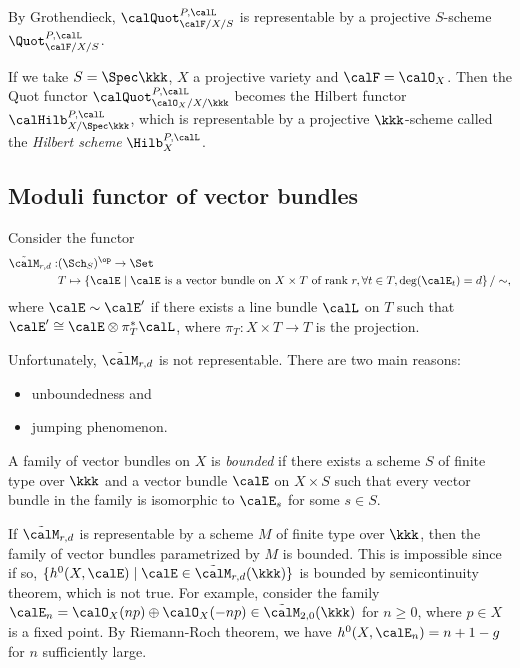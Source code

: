     By Grothendieck, \(\calQuot_{\calF/X/S}^{P,\calL}\) is representable by a projective \(S\)-scheme \(\Quot_{\calF/X/S}^{P,\calL}\).

    If we take \(S = \Spec \kkk\), \(X\) a projective variety and \(\calF = \calO_X\).
    Then the Quot functor \(\calQuot_{\calO_X/X/\kkk}^{P,\calL}\) becomes the Hilbert functor \(\calHilb_{X/\Spec \kkk}^{P,\calL}\), which is representable by a projective \(\kkk\)-scheme called the \emph{Hilbert scheme} \(\Hilb_X^{P,\calL}\).

\subsection{Moduli functor of vector bundles}

    Consider the functor 
    \begin{align*}
        \tilde{\calM}_{r,d} : & (\Sch_S)^{\op} \to \Set \\
        & T \mapsto \left\{ 
            \calE 
        \;\middle|\;
            \calE \text{ is a vector bundle on } X \times T \text{ of rank } r, \forall t \in T, \deg(\calE_t) = d
         \right\}/ \sim,
    \end{align*}
    where \(\calE \sim \calE'\) if there exists a line bundle \(\calL\) on \(T\) such that \(\calE' \cong \calE \otimes \pi_T^* \calL\), where \(\pi_T : X \times T \to T\) is the projection.

    Unfortunately, \(\tilde{\calM}_{r,d}\) is not representable.
    There are two main reasons:
    \begin{itemize}
        \item unboundedness and 
        \item jumping phenomenon.
    \end{itemize}

    \begin{definition}\label{def:bounded_family}
        A family of vector bundles on \(X\) is \emph{bounded} 
        if there exists a scheme \(S\) of finite type over \(\kkk\) and a vector bundle \(\calE\) on \(X \times S\) 
        such that every vector bundle in the family is isomorphic to \(\calE_s\) for some \(s \in S\).
    \end{definition}

    If \(\tilde{\calM}_{r,d}\) is representable by a scheme \(M\) of finite type over \(\kkk\), then the family of vector bundles parametrized by \(M\) is bounded.
    This is impossible since if so, \(\{h^0(X,\calE) \mid \calE \in \tilde{\calM}_{r,d}(\kkk)\}\) is bounded by semicontinuity theorem, which is not true.
    For example, consider the family \(\calE_n = \calO_X(np) \oplus \calO_X(-np) \in \tilde{\calM}_{2,0}(\kkk)\) for \(n \geq 0\), where \(p \in X\) is a fixed point.
    By Riemann-Roch theorem, we have \(h^0(X,\calE_n) = n + 1-g\) for \(n\) sufficiently large.

